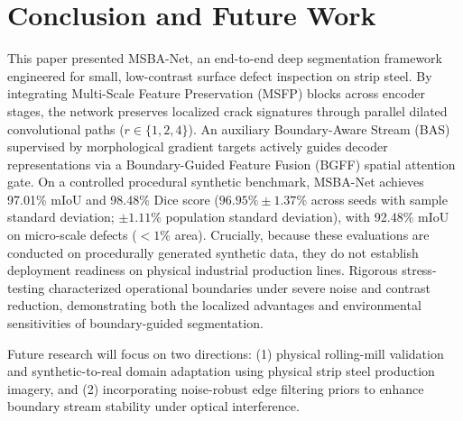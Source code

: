 \documentclass{ieeeaccess}
\begin{document}
\section{Conclusion and Future Work}
\label{sec:conclusion_future}
This paper presented MSBA-Net, an end-to-end deep segmentation framework engineered for small, low-contrast surface defect inspection on strip steel. By integrating Multi-Scale Feature Preservation (MSFP) blocks across encoder stages, the network preserves localized crack signatures through parallel dilated convolutional paths ($r \in \{1, 2, 4\}$). An auxiliary Boundary-Aware Stream (BAS) supervised by morphological gradient targets actively guides decoder representations via a Boundary-Guided Feature Fusion (BGFF) spatial attention gate. On a controlled procedural synthetic benchmark, MSBA-Net achieves 97.01\% mIoU and 98.48\% Dice score ($96.95\% \pm 1.37\%$ across seeds with sample standard deviation; $\pm 1.11\%$ population standard deviation), with 92.48\% mIoU on micro-scale defects ($<1\%$ area). Crucially, because these evaluations are conducted on procedurally generated synthetic data, they do not establish deployment readiness on physical industrial production lines. Rigorous stress-testing characterized operational boundaries under severe noise and contrast reduction, demonstrating both the localized advantages and environmental sensitivities of boundary-guided segmentation.

Future research will focus on two directions: (1) physical rolling-mill validation and synthetic-to-real domain adaptation using physical strip steel production imagery, and (2) incorporating noise-robust edge filtering priors to enhance boundary stream stability under optical interference.




\EOD
\end{document}
